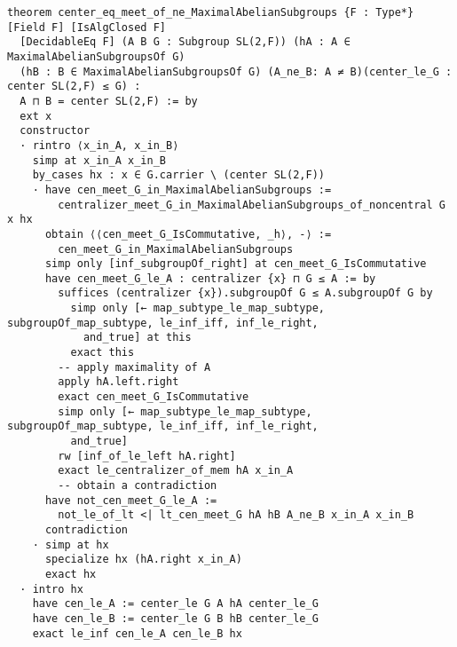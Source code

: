 \begin{footnotesize}
\begin{verbatim}
theorem center_eq_meet_of_ne_MaximalAbelianSubgroups {F : Type*} [Field F] [IsAlgClosed F]
  [DecidableEq F] (A B G : Subgroup SL(2,F)) (hA : A ∈ MaximalAbelianSubgroupsOf G)
  (hB : B ∈ MaximalAbelianSubgroupsOf G) (A_ne_B: A ≠ B)(center_le_G : center SL(2,F) ≤ G) :
  A ⊓ B = center SL(2,F) := by
  ext x
  constructor
  · rintro ⟨x_in_A, x_in_B⟩
    simp at x_in_A x_in_B
    by_cases hx : x ∈ G.carrier \ (center SL(2,F))
    · have cen_meet_G_in_MaximalAbelianSubgroups :=
        centralizer_meet_G_in_MaximalAbelianSubgroups_of_noncentral G x hx
      obtain ⟨⟨cen_meet_G_IsCommutative, _h⟩, -⟩ :=
        cen_meet_G_in_MaximalAbelianSubgroups
      simp only [inf_subgroupOf_right] at cen_meet_G_IsCommutative
      have cen_meet_G_le_A : centralizer {x} ⊓ G ≤ A := by
        suffices (centralizer {x}).subgroupOf G ≤ A.subgroupOf G by
          simp only [← map_subtype_le_map_subtype, subgroupOf_map_subtype, le_inf_iff, inf_le_right,
            and_true] at this
          exact this
        -- apply maximality of A
        apply hA.left.right
        exact cen_meet_G_IsCommutative
        simp only [← map_subtype_le_map_subtype, subgroupOf_map_subtype, le_inf_iff, inf_le_right,
          and_true]
        rw [inf_of_le_left hA.right]
        exact le_centralizer_of_mem hA x_in_A
        -- obtain a contradiction
      have not_cen_meet_G_le_A :=
        not_le_of_lt <| lt_cen_meet_G hA hB A_ne_B x_in_A x_in_B
      contradiction
    · simp at hx
      specialize hx (hA.right x_in_A)
      exact hx
  · intro hx
    have cen_le_A := center_le G A hA center_le_G
    have cen_le_B := center_le G B hB center_le_G
    exact le_inf cen_le_A cen_le_B hx
\end{verbatim}
\end{footnotesize}


